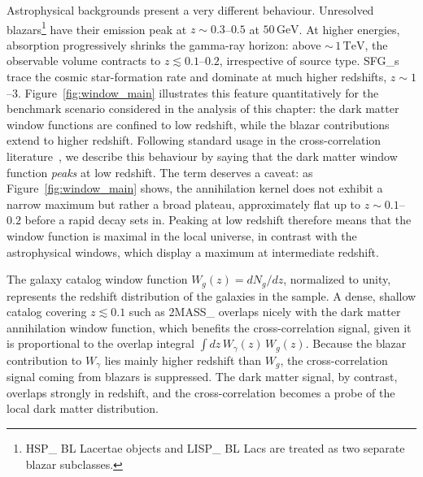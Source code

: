 Astrophysical backgrounds present a very different behaviour.
Unresolved blazars\footnote{\Gls{HSP_} BL Lacertae objects and \gls{LISP_} BL Lacs are treated as two separate blazar subclasses.} have their emission peak at $z \sim 0.3$--$0.5$ at $50\,\mathrm{GeV}$.
At higher energies, \EBL absorption progressively shrinks the gamma-ray horizon: above ${\sim}\,1\,\mathrm{TeV}$, the observable volume contracts to $z \lesssim 0.1$--$0.2$, irrespective of source type.
\Glspl{SFG_} trace the cosmic star-formation rate and dominate at much higher redshifts, $z \sim 1$--$3$.
Figure~\ref{fig:window_main} illustrates this feature quantitatively for the benchmark scenario considered in the analysis of this chapter: the dark matter window functions are confined to low redshift, while the blazar contributions extend to higher redshift.
Following standard usage in the cross-correlation literature~\cite{Fornengo:2013rga,Cuoco:2015rfa}, we describe this behaviour by saying that the dark matter window function \emph{peaks} at low redshift.
The term deserves a caveat: as Figure~\ref{fig:window_main} shows, the annihilation kernel does not exhibit a narrow maximum but rather a broad plateau, approximately flat up to $z \sim 0.1$--$0.2$ before a rapid decay sets in.
Peaking at low redshift therefore means that the window function is maximal in the local universe, in contrast with the astrophysical windows, which display a maximum at intermediate redshift.

The galaxy catalog window function $W_g(z) = dN_g/dz$, normalized to unity, represents the redshift distribution of the galaxies in the sample.
A dense, shallow catalog covering $z \lesssim 0.1$ such as \gls{2MASS_} overlaps nicely with the dark matter annihilation window function, which benefits
the cross-correlation signal, given it is proportional to the overlap integral $\int dz\,W_\gamma(z)\,W_g(z)$.
Because the blazar contribution to $W_\gamma$ lies mainly higher redshift than $W_g$, the cross-correlation signal coming from blazars is suppressed.
The dark matter signal, by contrast, overlaps strongly in redshift, and the cross-correlation becomes a probe of the local dark matter distribution.


